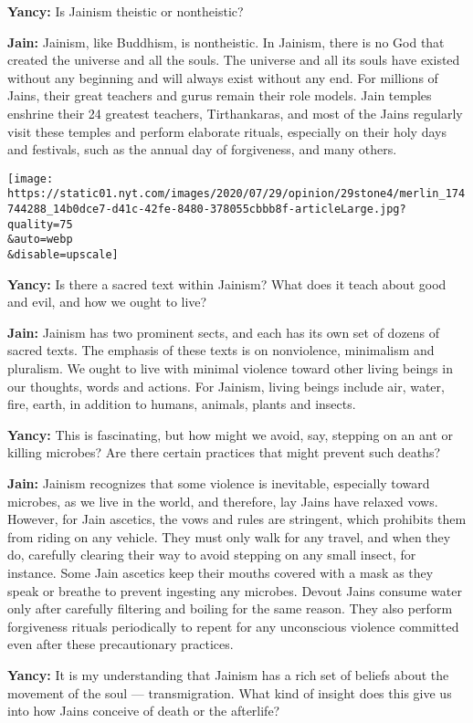 \textbf{Yancy:} Is Jainism theistic or nontheistic?

\textbf{Jain:} Jainism, like Buddhism, is nontheistic. In Jainism, there
is no God that created the universe and all the souls. The universe and
all its souls have existed without any beginning and will always exist
without any end. For millions of Jains, their great teachers and gurus
remain their role models. Jain temples enshrine their 24 greatest
teachers, Tirthankaras, and most of the Jains regularly visit these
temples and perform elaborate rituals, especially on their holy days and
festivals, such as the annual day of forgiveness, and many others.

\texttt{[image: https://static01.nyt.com/images/2020/07/29/opinion/29stone4/merlin\_174744288\_14b0dce7-d41c-42fe-8480-378055cbbb8f-articleLarge.jpg?quality=75\\\&auto=webp\\\&disable=upscale]}

\textbf{Yancy:} Is there a sacred text within Jainism? What does it
teach about good and evil, and how we ought to live?

\textbf{Jain:} Jainism has two prominent sects, and each has its own set
of dozens of sacred texts. The emphasis of these texts is on
nonviolence, minimalism and pluralism. We ought to live with minimal
violence toward other living beings in our thoughts, words and actions.
For Jainism, living beings include air, water, fire, earth, in addition
to humans, animals, plants and insects.

\textbf{Yancy:} This is fascinating, but how might we avoid, say,
stepping on an ant or killing microbes? Are there certain practices that
might prevent such deaths?

\textbf{Jain:} Jainism recognizes that some violence is inevitable,
especially toward microbes, as we live in the world, and therefore, lay
Jains have relaxed vows. However, for Jain ascetics, the vows and rules
are stringent, which prohibits them from riding on any vehicle. They
must only walk for any travel, and when they do, carefully clearing
their way to avoid stepping on any small insect, for instance. Some Jain
ascetics keep their mouths covered with a mask as they speak or breathe
to prevent ingesting any microbes. Devout Jains consume water only after
carefully filtering and boiling for the same reason. They also perform
forgiveness rituals periodically to repent for any unconscious violence
committed even after these precautionary practices.

\textbf{Yancy:} It is my understanding that Jainism has a rich set of
beliefs about the movement of the soul --- transmigration. What kind of
insight does this give us into how Jains conceive of death or the
afterlife?

